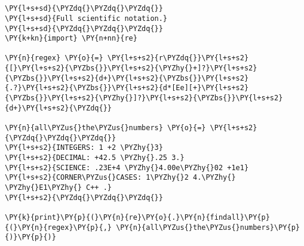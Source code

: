 

\section*{}

\begin{Verbatim}[commandchars=\\\{\}]
\PY{l+s+sd}{\PYZdq{}\PYZdq{}\PYZdq{}}
\PY{l+s+sd}{Full scientific notation.}
\PY{l+s+sd}{\PYZdq{}\PYZdq{}\PYZdq{}}
\PY{k+kn}{import} \PY{n+nn}{re}

\PY{n}{regex} \PY{o}{=} \PY{l+s+s2}{r\PYZdq{}}\PY{l+s+s2}{[}\PY{l+s+s2}{\PYZbs{}}\PY{l+s+s2}{\PYZhy{}+]?}\PY{l+s+s2}{\PYZbs{}}\PY{l+s+s2}{d+}\PY{l+s+s2}{\PYZbs{}}\PY{l+s+s2}{.?}\PY{l+s+s2}{\PYZbs{}}\PY{l+s+s2}{d*[Ee][+}\PY{l+s+s2}{\PYZbs{}}\PY{l+s+s2}{\PYZhy{}]?}\PY{l+s+s2}{\PYZbs{}}\PY{l+s+s2}{d+}\PY{l+s+s2}{\PYZdq{}}

\PY{n}{all\PYZus{}the\PYZus{}numbers} \PY{o}{=} \PY{l+s+s2}{\PYZdq{}\PYZdq{}\PYZdq{}}
\PY{l+s+s2}{INTEGERS: 1 +2 \PYZhy{}3}
\PY{l+s+s2}{DECIMAL: +42.5 \PYZhy{}.25 3.}
\PY{l+s+s2}{SCIENCE: .23E+4 \PYZhy{}4.00e\PYZhy{}02 +1e1}
\PY{l+s+s2}{CORNER\PYZus{}CASES: 1\PYZhy{}2 4.\PYZhy{} \PYZhy{}E1\PYZhy{} C++ .}
\PY{l+s+s2}{\PYZdq{}\PYZdq{}\PYZdq{}}

\PY{k}{print}\PY{p}{(}\PY{n}{re}\PY{o}{.}\PY{n}{findall}\PY{p}{(}\PY{n}{regex}\PY{p}{,} \PY{n}{all\PYZus{}the\PYZus{}numbers}\PY{p}{)}\PY{p}{)}
\end{Verbatim}


